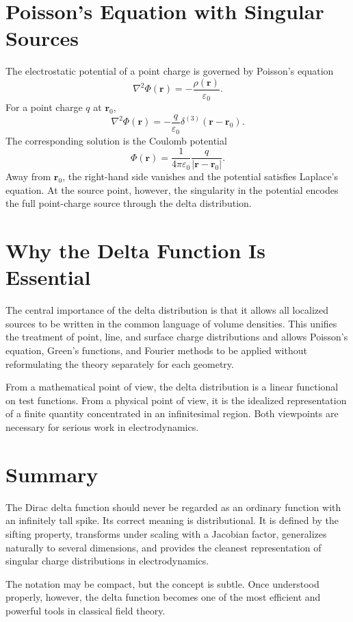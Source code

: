 \documentclass[12pt]{article}
\begin{document}
\section{Poisson's Equation with Singular Sources}
The electrostatic potential of a point charge is governed by Poisson's equation
\[
\nabla^2\Phi(\mathbf r)=-\frac{\rho(\mathbf r)}{\varepsilon_0}.
\]
For a point charge $q$ at $\mathbf r_0$,
\[
\nabla^2\Phi(\mathbf r)
=
-\frac{q}{\varepsilon_0}\delta^{(3)}(\mathbf r-\mathbf r_0).
\]
The corresponding solution is the Coulomb potential
\[
\Phi(\mathbf r)=\frac{1}{4\pi\varepsilon_0}\frac{q}{|\mathbf r-\mathbf r_0|}.
\]
Away from $\mathbf r_0$, the right-hand side vanishes and the potential satisfies Laplace's equation. At the source point, however, the singularity in the potential encodes the full point-charge source through the delta distribution.

\section{Why the Delta Function Is Essential}
The central importance of the delta distribution is that it allows all localized sources to be written in the common language of volume densities. This unifies the treatment of point, line, and surface charge distributions and allows Poisson's equation, Green's functions, and Fourier methods to be applied without reformulating the theory separately for each geometry.

From a mathematical point of view, the delta distribution is a linear functional on test functions. From a physical point of view, it is the idealized representation of a finite quantity concentrated in an infinitesimal region. Both viewpoints are necessary for serious work in electrodynamics.

\section{Summary}
The Dirac delta function should never be regarded as an ordinary function with an infinitely tall spike. Its correct meaning is distributional. It is defined by the sifting property, transforms under scaling with a Jacobian factor, generalizes naturally to several dimensions, and provides the cleanest representation of singular charge distributions in electrodynamics.

The notation may be compact, but the concept is subtle. Once understood properly, however, the delta function becomes one of the most efficient and powerful tools in classical field theory.
\end{document}

